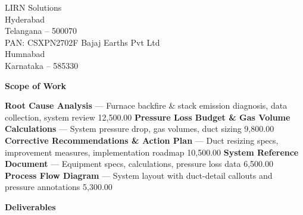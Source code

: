 \documentclass[invoice]{lirn}
\begin{document}
\lirnheader
{}
\lirninvoicemeta

\lirnrule

\lirninvoiceparties
  {%
    LIRN Solutions\\
    Hyderabad\\
    Telangana -- 500070\\
    PAN: CSXPN2702F
  }
  {%
    Bajaj Earths Pvt Ltd\\
    Humnabad\\
    Karnataka -- 585330
  }

\lirnrule

{\large\bfseries\color{LirnDark}Scope of Work}
\vspace{4pt}

\begin{lirnscope}
    {\textbf{Root Cause Analysis} --- {\small\color{LirnMuted}Furnace backfire \& stack emission diagnosis, data collection, system review}}
    {12,500.00}
    {\textbf{Pressure Loss Budget \& Gas Volume Calculations} --- {\small\color{LirnMuted}System pressure drop, gas volumes, duct sizing}}
    {9,800.00}
    {\textbf{Corrective Recommendations \& Action Plan} --- {\small\color{LirnMuted}Duct resizing specs, improvement measures, implementation roadmap}}
    {10,500.00}
    {\textbf{System Reference Document} --- {\small\color{LirnMuted}Equipment specs, calculations, pressure loss data}}
    {6,500.00}
    {\textbf{Process Flow Diagram} --- {\small\color{LirnMuted}System layout with duct-detail callouts and pressure annotations}}
    {5,300.00}
\end{lirnscope}

\lirngst

\lirnrule


\lirnrule

{\large\bfseries\color{LirnDark}Deliverables}
\vspace{2pt}
\end{document}
